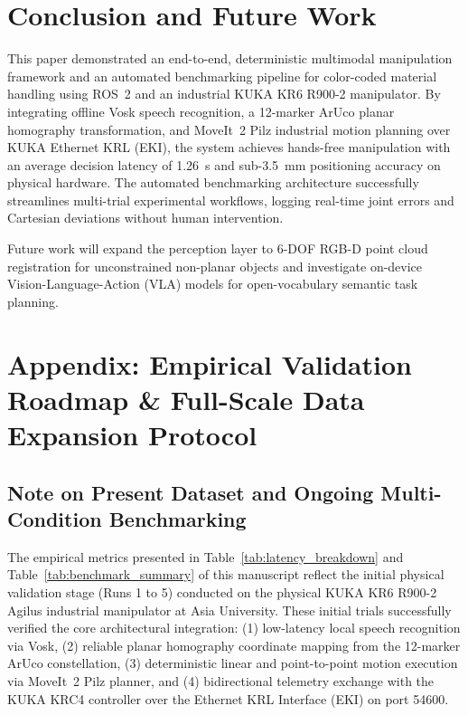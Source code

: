 \documentclass[runningheads]{llncs}
\begin{document}
\section{Conclusion and Future Work}
\label{sec:conclusion}

This paper demonstrated an end-to-end, deterministic multimodal manipulation framework and an automated benchmarking pipeline for color-coded material handling using ROS~2 and an industrial KUKA KR6 R900-2 manipulator. By integrating offline Vosk speech recognition, a 12-marker ArUco planar homography transformation, and MoveIt~2 Pilz industrial motion planning over KUKA Ethernet KRL (EKI), the system achieves hands-free manipulation with an average decision latency of \SI{1.26}{\second} and sub-\SI{3.5}{\milli\meter} positioning accuracy on physical hardware. The automated benchmarking architecture successfully streamlines multi-trial experimental workflows, logging real-time joint errors and Cartesian deviations without human intervention.

Future work will expand the perception layer to 6-DOF RGB-D point cloud registration for unconstrained non-planar objects and investigate on-device Vision-Language-Action (VLA) models for open-vocabulary semantic task planning.




\newpage
\section*{Appendix: Empirical Validation Roadmap \& Full-Scale Data Expansion Protocol}

\subsection*{Note on Present Dataset and Ongoing Multi-Condition Benchmarking}
The empirical metrics presented in Table~\ref{tab:latency_breakdown} and Table~\ref{tab:benchmark_summary} of this manuscript reflect the initial physical validation stage (Runs 1 to 5) conducted on the physical KUKA KR6 R900-2 Agilus industrial manipulator at Asia University. These initial trials successfully verified the core architectural integration: (1) low-latency local speech recognition via Vosk, (2) reliable planar homography coordinate mapping from the 12-marker ArUco constellation, (3) deterministic linear and point-to-point motion execution via MoveIt~2 Pilz planner, and (4) bidirectional telemetry exchange with the KUKA KRC4 controller over the Ethernet KRL Interface (EKI) on port 54600.
\end{document}
